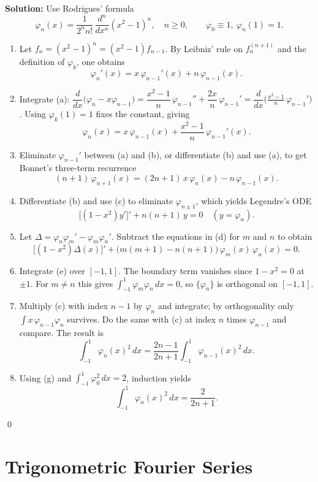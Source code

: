 \noindent\textbf{Solution:}
Use Rodrigues' formula
\[
\varphi_n(x)=\frac{1}{2^{n} n!}\,\frac{d^n}{dx^n}(x^2-1)^n,\quad n\ge0,\qquad \varphi_0\equiv1,\ \varphi_n(1)=1.
\]
\begin{enumerate}[label=(\alph*)]
\item Let $f_n=(x^2-1)^n=(x^2-1)f_{n-1}$. By Leibniz' rule on $f_n^{(n+1)}$ and the definition of $\varphi_k$, one obtains
\[
\varphi_n'(x)=x\,\varphi_{n-1}'(x)+n\,\varphi_{n-1}(x).
\]
\item Integrate (a): $\dfrac{d}{dx}\big(\varphi_n - x\varphi_{n-1}\big) = \dfrac{x^2-1}{n}\,\varphi_{n-1}'' + \dfrac{2x}{n}\,\varphi_{n-1}' = \dfrac{d}{dx}\Big( \frac{x^2-1}{n}\,\varphi_{n-1}' \Big)$. Using $\varphi_k(1)=1$ fixes the constant, giving
\[
\varphi_n(x)=x\,\varphi_{n-1}(x)+\frac{x^2-1}{n}\,\varphi_{n-1}'(x).
\]
\item Eliminate $\varphi_{n-1}'$ between (a) and (b), or differentiate (b) and use (a), to get Bonnet's three-term recurrence
\[
(n+1)\,\varphi_{n+1}(x)=(2n+1)\,x\,\varphi_n(x)-n\,\varphi_{n-1}(x).
\]
\item Differentiate (b) and use (c) to eliminate $\varphi_{n\pm1}$, which yields Legendre's ODE
\[
\big[(1-x^2)y'\big]' + n(n+1)\,y=0\quad (y=\varphi_n).
\]
\item Let $\Delta=\varphi_n\varphi_m'-\varphi_m\varphi_n'$. Subtract the equations in (d) for $m$ and $n$ to obtain
\[
\big[(1-x^2)\Delta(x)\big]'+\big(m(m+1)-n(n+1)\big)\,\varphi_m(x)\,\varphi_n(x)=0.
\]
\item Integrate (e) over $[-1,1]$. The boundary term vanishes since $1-x^2=0$ at $\pm1$. For $m\ne n$ this gives $\int_{-1}^1\varphi_m\varphi_n\,dx=0$, so $\{\varphi_n\}$ is orthogonal on $[-1,1]$.
\item Multiply (c) with index $n-1$ by $\varphi_n$ and integrate; by orthogonality only $\int x\,\varphi_{n-1}\varphi_n$ survives. Do the same with (c) at index $n$ times $\varphi_{n-1}$ and compare. The result is
\[
\int_{-1}^1 \varphi_n(x)^2\,dx=\frac{2n-1}{2n+1}\int_{-1}^1 \varphi_{n-1}(x)^2\,dx.
\]
\item Using (g) and $\int_{-1}^1\varphi_0^2\,dx=2$, induction yields
\[
\int_{-1}^1 \varphi_n(x)^2\,dx=\frac{2}{2n+1}.
\]
\end{enumerate}\qed
\section{Trigonometric Fourier Series}



